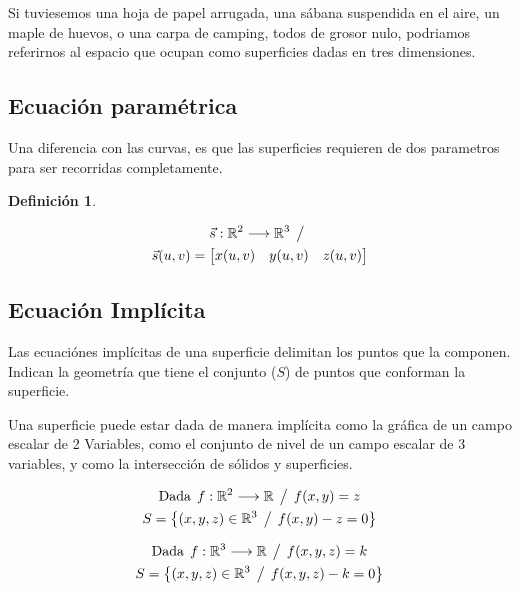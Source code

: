 \documentclass[a5paper,12pt,twoside]{book}
\newtheorem{defn}{{Definición}}[chapter]
\begin{document}
Si tuviesemos una hoja de papel arrugada, una sábana suspendida en el aire, un maple de huevos, o una carpa de camping, todos de grosor nulo, podriamos referirnos al espacio que ocupan como superficies dadas en tres dimensiones.


\subsection{Ecuación paramétrica}

Una diferencia con las curvas, es que las superficies requieren de dos parametros para ser recorridas completamente.

\begin{mdframed}[style=DefinitionFrame]
    \begin{defn}
    \end{defn}
    \begin{multline*}
        \Vec{s}: \mathbb{R}^2 \longrightarrow \mathbb{R}^3 \hspace{1ex} \big/ \hspace{1ex}
        \\
        \Vec{s}(u,v) = \begin{bmatrix} x(u,v) & y(u,v) & z(u,v) \end{bmatrix}
    \end{multline*}
\end{mdframed}


\subsection{Ecuación Implícita}

Las ecuaciónes implícitas de una superficie delimitan los puntos que la componen.
Indican la geometría que tiene el conjunto ($S$) de puntos que conforman la superficie.

Una superficie puede estar dada de manera implícita como la gráfica de un campo escalar de 2 Variables, como el conjunto de nivel de un campo escalar de 3 variables, y como la intersección de sólidos y superficies.

\begin{gather*}
    \textrm{Dada} \hspace{1ex} f:\mathbb{R}^2 \longrightarrow \mathbb{R} \hspace{1ex} \big/ \hspace{1ex} f(x,y)=z
    \\
    S= { \left\{ { (x,y,z) \in \mathbb{R}^3 \hspace{1ex} \big/ \hspace{1ex} f(x,y)-z=0 } \right\} }
\end{gather*}

\begin{gather*}
    \textrm{Dada} \hspace{1ex}  f:\mathbb{R}^3 \longrightarrow \mathbb{R} \hspace{1ex} \big/ \hspace{1ex} f(x,y,z)=k
    \\
    S= { \left\{ { (x,y,z) \in \mathbb{R}^3 \hspace{1ex} \big/ \hspace{1ex} f(x,y,z)-k=0 } \right\} }
\end{gather*}
\end{document}
